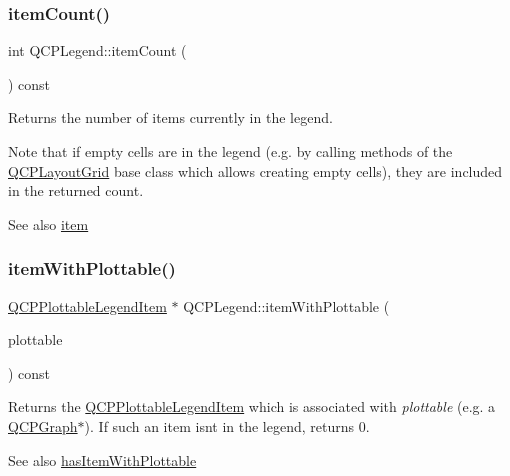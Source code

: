 \subsubsection{\texorpdfstring{item\+Count()}{itemCount()}}
{\footnotesize\ttfamily int Q\+C\+P\+Legend\+::item\+Count (\begin{DoxyParamCaption}{ }\end{DoxyParamCaption}) const}

Returns the number of items currently in the legend.

Note that if empty cells are in the legend (e.\+g. by calling methods of the \hyperlink{class_q_c_p_layout_grid}{Q\+C\+P\+Layout\+Grid} base class which allows creating empty cells), they are included in the returned count.

\begin{DoxySeeAlso}{See also}
\hyperlink{class_q_c_p_legend_acfe9694c45104a3359d3806ed366fcf7}{item} 
\end{DoxySeeAlso}
\mbox{\label{class_q_c_p_legend_a91e790002d8bf15a20628a8e8841e397}} 
\subsubsection{\texorpdfstring{item\+With\+Plottable()}{itemWithPlottable()}}
{\footnotesize\ttfamily \hyperlink{class_q_c_p_plottable_legend_item}{Q\+C\+P\+Plottable\+Legend\+Item} $\ast$ Q\+C\+P\+Legend\+::item\+With\+Plottable (\begin{DoxyParamCaption}\item[{const \hyperlink{class_q_c_p_abstract_plottable}{Q\+C\+P\+Abstract\+Plottable} $\ast$}]{plottable }\end{DoxyParamCaption}) const}

Returns the \hyperlink{class_q_c_p_plottable_legend_item}{Q\+C\+P\+Plottable\+Legend\+Item} which is associated with {\itshape plottable} (e.\+g. a \hyperlink{class_q_c_p_graph}{Q\+C\+P\+Graph}$\ast$). If such an item isn\textquotesingle{}t in the legend, returns 0.

\begin{DoxySeeAlso}{See also}
\hyperlink{class_q_c_p_legend_a4b90a442af871582df85c2bc13f91e88}{has\+Item\+With\+Plottable} 
\end{DoxySeeAlso}
\mbox{\label{class_q_c_p_legend_ac91595c3eaa746fe6321d2eb952c63bb}} 
